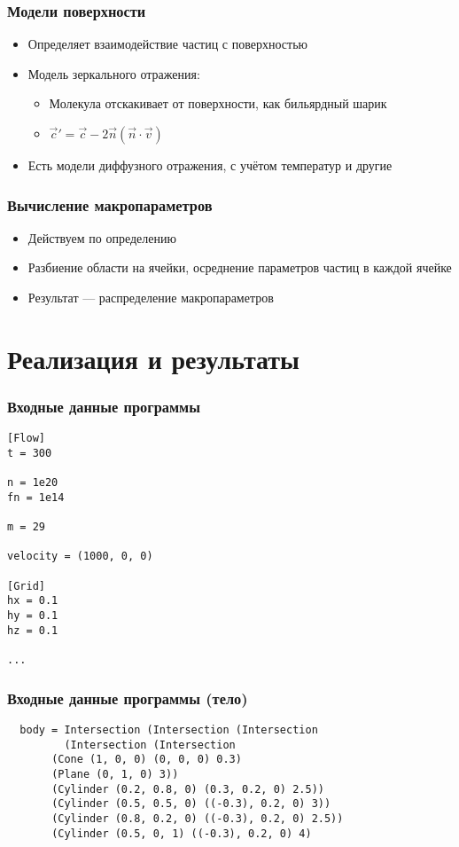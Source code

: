 \documentclass[onlymath]{beamer}
\begin{document}
\begin{frame}
  \frametitle{Модели поверхности}
  \begin{itemize}
  \item Определяет взаимодействие частиц с поверхностью
  \item Модель зеркального отражения:
    \begin{itemize}
    \item Молекула отскакивает от поверхности, как бильярдный шарик
    \item $\vec{c}' = \vec{c} - 2\vec{n}(\vec{n} \cdot\vec{v})$
    \end{itemize}
  \item Есть модели диффузного отражения, с учётом температур и другие
  \end{itemize}
\end{frame}

\begin{frame}
  \frametitle{Вычисление макропараметров}
  \begin{itemize}
  \item Действуем по определению
  \item Разбиение области на ячейки, осреднение параметров частиц в
    каждой ячейке
  \item Результат — распределение макропараметров
  \end{itemize}
\end{frame}

\section{Реализация и результаты}

\begin{frame}[fragile]
  \frametitle{Входные данные программы}
\begin{lstlisting}
[Flow]
t = 300

n = 1e20
fn = 1e14

m = 29

velocity = (1000, 0, 0)

[Grid]
hx = 0.1
hy = 0.1
hz = 0.1

...
\end{lstlisting}
\end{frame}

\begin{frame}[fragile]
  \frametitle{Входные данные программы (тело)}
\begin{lstlisting}
  body = Intersection (Intersection (Intersection
         (Intersection (Intersection
       (Cone (1, 0, 0) (0, 0, 0) 0.3)
       (Plane (0, 1, 0) 3))
       (Cylinder (0.2, 0.8, 0) (0.3, 0.2, 0) 2.5))
       (Cylinder (0.5, 0.5, 0) ((-0.3), 0.2, 0) 3))
       (Cylinder (0.8, 0.2, 0) ((-0.3), 0.2, 0) 2.5))
       (Cylinder (0.5, 0, 1) ((-0.3), 0.2, 0) 4)
\end{lstlisting}

\end{frame}
\end{document}
